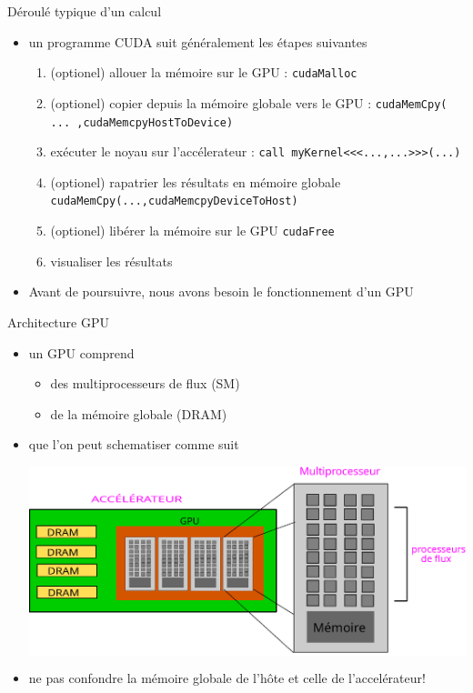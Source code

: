 \documentclass[11pt,mathserif]{beamer}
\newcommand{\scout}{\faAngellist}
\newcommand{\argi}{\faLightbulbO}
\newcommand{\kontuz}{\faExclamationTriangle}
\newcommand{\geldi}{\faHandPaperO}
\newif\ifC
\begin{document}
\begin{frame}{Déroulé typique d'un calcul}
  \lstset{basicstyle=\ttfamily}
\pause
  \begin{itemize}[<+->]
    \item[\argi] un programme CUDA suit généralement les étapes suivantes 
\begin{enumerate}[<+->]
 \item \ifC \else (optionel) \fi allouer la mémoire sur le GPU : \lstinline!cudaMalloc!
 \item \ifC \else (optionel) \fi copier depuis la mémoire globale vers le GPU : \lstinline!cudaMemCpy( ... ,cudaMemcpyHostToDevice)!
 \item exécuter le noyau sur l'accélerateur : \ifC \lstinline!myKernel<<<...,...>>>(...)! 
 \else \lstinline!call myKernel<<<...,...>>>(...)! \fi
 \item \ifC \else (optionel) \fi rapatrier les résultats en mémoire globale \lstinline!cudaMemCpy(...,cudaMemcpyDeviceToHost)!
 \item \ifC \else (optionel) \fi libérer la mémoire sur le GPU \lstinline!cudaFree!
 \item visualiser les résultats
\end{enumerate}
\item[\geldi] Avant de poursuivre, nous avons besoin le fonctionnement d'un GPU
\end{itemize}
\end{frame}
\begin{frame}{Architecture GPU}
\begin{itemize}[<+->]
  \item[\scout] un GPU comprend 
   \begin{itemize} 
     \item des multiprocesseurs de flux (SM)
     \item de la mémoire globale (DRAM)
   \end{itemize} 
  \item que l'on peut schematiser comme suit
  \begin{center}
    \colorbox{white}{\includegraphics[width=0.8\linewidth]{fig/archi_gpu.eps}}
  \end{center}
  \item[\kontuz] ne pas confondre la mémoire globale de l'hôte et celle de l'accelérateur!
\end{itemize}
\end{frame}
\end{document}
